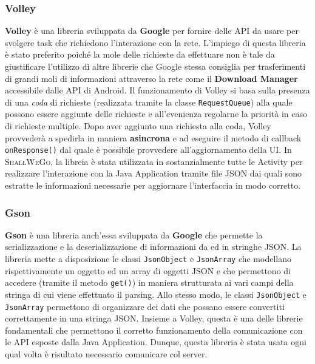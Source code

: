                 \subsubsection{Volley}
                    \textbf{Volley} è una libreria sviluppata da \textbf{Google} per fornire delle API da usare per svolgere task che richiedono l'interazione con la rete. L'impiego di questa libreria è stato preferito poiché la mole delle richieste da effettuare non è tale da giustificare l'utilizzo di altre librerie che Google stessa consiglia per trasferimenti di grandi moli di informazioni attraverso la rete come il \textbf{Download Manager} accessibile dalle API di Android. Il funzionamento di Volley si basa sulla presenza di una \textit{coda} di richieste (realizzata tramite la classe \texttt{RequestQueue}) alla quale possono essere aggiunte delle richieste e all'evenienza regolarne la priorità in caso di richieste multiple.
                    Dopo aver aggiunto una richiesta alla coda, Volley provvederà a spedirla in maniera \textbf{asincrona} e ad eseguire il metodo di callback \texttt{onResponse()} dal quale è possibile provvedere all'aggiornamento della UI. In \textsc{ShallWeGo}, la libreia è stata utilizzata in sostanzialmente tutte le Activity per realizzare l'interazione con la Java Application tramite file JSON dai quali sono estratte le informazioni necessarie per aggiornare l'interfaccia in modo corretto.
                
                \subsubsection{Gson}
                    \textbf{Gson} è una libreria anch'essa sviluppata da \textbf{Google} che permette la serializzazione e la deserializzazione di informazioni da ed in stringhe JSON. La libreria mette a disposizione le classi \texttt{JsonObject} e \texttt{JsonArray} che modellano rispettivamente un oggetto ed un array di oggetti JSON e che permettono di accedere (tramite il metodo \texttt{get()}) in maniera strutturata ai vari campi della stringa di cui viene effettuato il parsing. Allo stesso modo, le classi \texttt{JsonObject} e \texttt{JsonArray} permettono di organizzare dei dati che possano essere convertiti correttamente in una stringa JSON. Insieme a Volley, questa è una delle librerie fondamentali che permettono il corretto funzionamento della comunicazione con le API esposte dalla Java Application. Dunque, questa libreria è stata usata ogni qual volta è risultato necessario comunicare col server.

